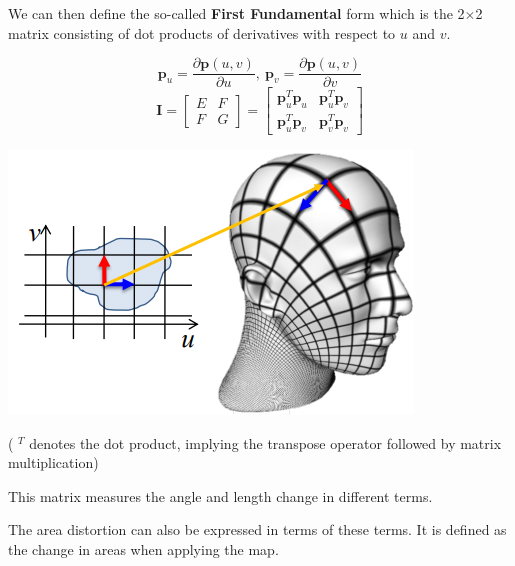 \documentclass{article}
\begin{document}
\def\E{\mathbf{p}_{u}^T \mathbf{p}_{u}}
\def\F{\mathbf{p}_{u}^T \mathbf{p}_{v}}
\def\G{\mathbf{p}_{v}^T \mathbf{p}_{v}}


We can then define the so-called \textbf{First Fundamental} form which is the 2\(\times\)2 matrix 
consisting of dot products of derivatives with respect to \(u\) and \(v\). 

\begin{minipage}{0.435\textwidth}
    \[
        \mathbf{p}_u = \frac{\partial \mathbf{p}(u,v)}{\partial u}, \ \mathbf{p}_v = \frac{\partial \mathbf{p}(u,v)}{\partial v}
    \]
    \[
        \mathbf{I} = 
        \begin{bmatrix}
            E & F \\
            F & G
        \end{bmatrix}
        = 
        \begin{bmatrix}
            \E & \F \\[6pt]
            \F & \G
        \end{bmatrix}
    \]
\end{minipage}
\begin{minipage}{0.435\textwidth}
    \includegraphics[width=1\linewidth]{images/parameterization_distortion.png}
\end{minipage}

( \(^T\) denotes the dot product, implying the transpose operator followed by matrix multiplication)

\vspace{10px}

This matrix measures the angle and length change in different terms.

The area distortion can also be expressed in terms of these terms. It is defined as the change in areas when
applying the map.
\end{document}
